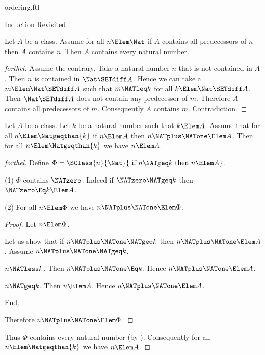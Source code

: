 \documentclass{stex}
\begin{document}
\begin{smodule}{ordering.ftl}
\begin{sfragment}{Induction Revisited}
  \begin{theorem}[forthel,name=induction II]
    Let $A$ be a class.
    Assume for all $n \Elem \Nat$ if $A$ contains all predecessors of $n$ then $A$ contains $n$.
    Then $A$ contains every natural number.
  \end{theorem}
  \begin{proof}[forthel]
    Assume the contrary.
    Take a natural number $n$ that is not contained in $A$.
    Then $n$ is contained in $\Nat \SETdiff A$.
    Hence we can take a $m \Elem \Nat \SETdiff A$ such that $m \NATleq k$ for all $k \Elem \Nat \SETdiff A$.
    Then $\Nat \SETdiff A$ does not contain any predecessor of $m$.
    Therefore $A$ contains all predecessors of $m$.
    Consequently $A$ contains $m$.
    Contradiction.
  \end{proof}


  \begin{theorem}[forthel,name=induction III]
    Let $A$ be a class.
    Let $k$ be a natural number such that $k \Elem A$.
    Assume that for all $n \Elem \Natgeqthan{k}$ if $n \Elem A$ then $n \NATplus \NATone \Elem A$.
    Then for all $n \Elem \Natgeqthan{k}$ we have $n \Elem A$.
  \end{theorem}
  \begin{proof}[forthel]
    Define $\Phi = \SClass{n}{\Nat}{\text{ if }n \NATgeq k\text{ then }n \Elem A}$.

    (1) $\Phi$ contains $\NATzero$.
    Indeed if $\NATzero \NATgeq k$ then $\NATzero \Eq k \Elem A$.

    (2) For all $n \Elem \Phi$ we have $n \NATplus \NATone \Elem \Phi$.
    \begin{proof}
      Let $n \Elem \Phi$.

      Let us show that if $n \NATplus \NATone \NATgeq k$ then $n \NATplus \NATone \Elem A$.
        Assume $n \NATplus \NATone \NATgeq k$.

        \begin{case}{$n \NATless k$.}
          Then $n \NATplus \NATone \Eq k$.
          Hence $n \NATplus \NATone \Elem A$.
        \end{case}

        \begin{case}{$n \NATgeq k$.}
          Then $n \Elem A$.
          Hence $n \NATplus \NATone \Elem A$.
        \end{case}
      End.

      Therefore $n \NATplus \NATone \Elem \Phi$.
    \end{proof}

    Thus $\Phi$ contains every natural number (by ).
    Consequently for all $n \Elem \Natgeqthan{k}$ we have $n \Elem A$.
  \end{proof}
\end{sfragment}
\end{smodule}
\end{document}

